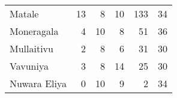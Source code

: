 \begin{tabular}{lrrrrr}
Matale       &          13 &           8 &           10 &              133 &          34 \\
Moneragala   &           4 &          10 &            8 &               51 &          36 \\
Mullaitivu   &           2 &           8 &            6 &               31 &          30 \\
Vavuniya     &           3 &           8 &           14 &               25 &          30 \\
Nuwara Eliya &           0 &          10 &            9 &                2 &          34 \\
\bottomrule
\end{tabular}
